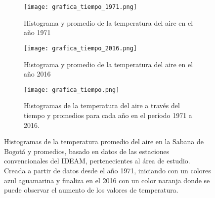 

\begin{figure}[H]
	
	\begin{subfigure}[b]{\linewidth}
	\begin{center}
	\caption{Histograma y promedio de la temperatura del aire en el año 1971}	
	\texttt{[image: grafica\_tiempo\_1971.png]}
		\label{graph:histo_tiempo_1971}
		
	\end{center}
	\end{subfigure}

		
	\begin{subfigure}[b]{\linewidth}
	\begin{center}
	\caption{Histograma y promedio de la temperatura del aire en el año 2016}		
	\texttt{[image: grafica\_tiempo\_2016.png]}
		\label{graph:histo_tiempo_2016}
		
	\end{center}
	\end{subfigure}
    
    \begin{subfigure}[b]{\linewidth}
	\begin{center}
	\caption{Histogramas de la temperatura del aire a través del tiempo y promedios para cada año en el período 1971 a 2016.}		
	\texttt{[image: grafica\_tiempo.png]}
		\label{graph:histo_tiempo}
		
	\end{center}
	\end{subfigure}
	
	
	\caption{Histogramas de la temperatura promedio del aire en la Sabana de Bogotá y promedios, basado en datos de las estaciones convencionales del IDEAM, pertenecientes al área de estudio. Creada a partir de datos desde el año 1971, iniciando con un colores azul aguamarina y finaliza en el 2016 con un color naranja donde se puede observar el aumento de los valores de temperatura.}		
	\label{graph:evol_tmp_sabana} 
		
\end{figure}

